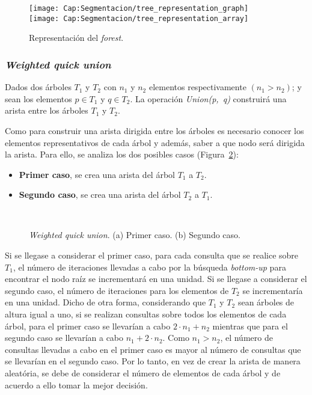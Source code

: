 \begin{figure}[h!]
  \centering
  \texttt{[image: Cap:Segmentacion/tree\_representation\_graph]}\\
  \texttt{[image: Cap:Segmentacion/tree\_representation\_array]}
	\caption{Representación del \textit{forest}.}
	\label{fig:cap-segmentacion:forest_representacion}
\end{figure}

\subsubsection{\textit{Weighted quick union}}
Dados dos árboles $T_1$ y $T_2$ con $n_1$ y $n_2$ elementos respectivamente 
$(n_1 > n_2)$; y sean los elementos $p \in T_1$ y $q \in T_2$. La operación
\textit{Union(p,~q)} construirá una arista entre los árboles $T_1$ y $T_2$. 

Como para construir una arista dirigida entre los árboles es necesario conocer
los elementos representativos de cada árbol y además, saber a que nodo será
dirigida la arista. Para ello, se analiza los dos posibles casos
(Figura~\ref{fig:cap-segmentacion:UF_weight}):
\begin{itemize}
	\item \textbf{Primer caso}, se crea una arista del árbol $T_1$ a $T_2$.
	\item \textbf{Segundo caso}, se crea una arista del árbol $T_2$ a $T_1$.
\end{itemize}
\begin{figure}[h!]
  \centering
	 { \, \, \, \, }
   \\ 
	\caption[\textit{Weighted quick union}]{\textit{Weighted quick union}. 
	(a) Primer caso. (b) Segundo caso.}
	\label{fig:cap-segmentacion:UF_weight}
\end{figure}

Si se llegase a considerar el primer caso, para cada consulta que se realice
sobre $T_1$, el número de iteraciones llevadas a cabo por la búsqueda
\textit{bottom-up} para encontrar el nodo raíz se incrementará en una unidad.
Si se llegase a considerar el segundo caso, el número de iteraciones para los
elementos de $T_2$ se incrementaría en una unidad. Dicho de otra forma, 
considerando que $T_1$ y $T_2$ sean árboles de altura igual a uno, si se
realizan consultas sobre todos los elementos de cada árbol, para el primer
caso se llevarían a cabo $2 \cdot n_1 + n_2$ mientras que para el segundo
caso se llevarían a cabo $n_1 + 2 \cdot n_2$. Como $n_1 > n_2$, el número de 
consultas llevadas a cabo en el primer caso es mayor al número de consultas 
que se llevarían en el segundo caso. Por lo tanto, en vez de crear la arista
de manera aleatória, se debe de considerar el número de elementos de cada
árbol y de acuerdo a ello tomar la mejor decisión.


